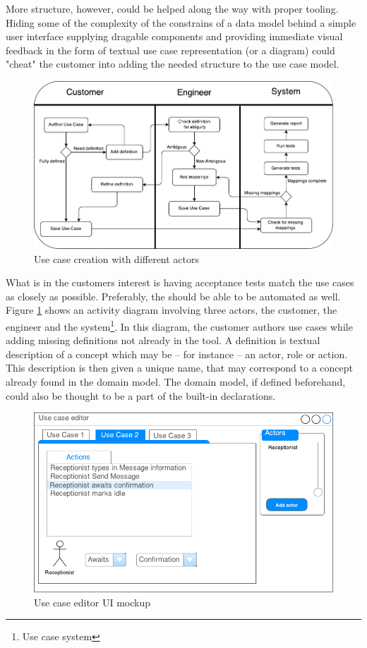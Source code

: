 More structure, however, could be helped along the way with proper tooling. Hiding some of the complexity of the constrains of a data model behind a simple user interface supplying dragable components and providing immediate visual feedback in the form of textual use case representation (or a diagram) could "cheat" the customer into adding the needed structure to the use case model.

\begin{figure}[h]
\includegraphics[scale=0.9]{img/use_case_creation_activity_diagram}
\centering
\caption{Use case creation with different actors}
\label{fig:use_case_creation_activity_diagram}
\end{figure}

What is in the customers interest is having acceptance tests match the use cases as closely as possible. Preferably, the should be able to be automated as well. Figure \ref{fig:use_case_creation_activity_diagram} shows an activity diagram involving three actors, the customer, the engineer and the system\footnote{Use case system}. In this diagram, the customer authors use cases while adding missing definitions not already in the tool. A definition is textual description of a concept which may be -- for instance -- an actor, role or action. This description is then given a unique name, that may correspond to a concept already found in the domain model. The domain model, if defined beforehand, could also be thought to be a part of the built-in declarations.

\begin{figure}[h]
\includegraphics[scale=0.9]{img/test_case_ui}
\centering
\caption{Use case editor UI mockup}
\label{fig:use_case_editor_mockup}
\end{figure}

